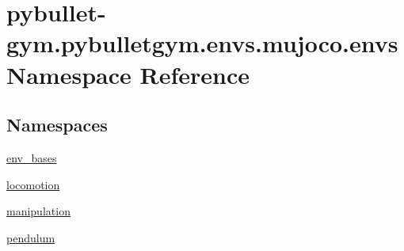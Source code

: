 \hypertarget{namespacepybullet-gym_1_1pybulletgym_1_1envs_1_1mujoco_1_1envs}{}\section{pybullet-\/gym.pybulletgym.\+envs.\+mujoco.\+envs Namespace Reference}
\label{namespacepybullet-gym_1_1pybulletgym_1_1envs_1_1mujoco_1_1envs}
\subsection*{Namespaces}
\begin{DoxyCompactItemize}
\item 
 \hyperlink{namespacepybullet-gym_1_1pybulletgym_1_1envs_1_1mujoco_1_1envs_1_1env__bases}{env\+\_\+bases}
\item 
 \hyperlink{namespacepybullet-gym_1_1pybulletgym_1_1envs_1_1mujoco_1_1envs_1_1locomotion}{locomotion}
\item 
 \hyperlink{namespacepybullet-gym_1_1pybulletgym_1_1envs_1_1mujoco_1_1envs_1_1manipulation}{manipulation}
\item 
 \hyperlink{namespacepybullet-gym_1_1pybulletgym_1_1envs_1_1mujoco_1_1envs_1_1pendulum}{pendulum}
\end{DoxyCompactItemize}
